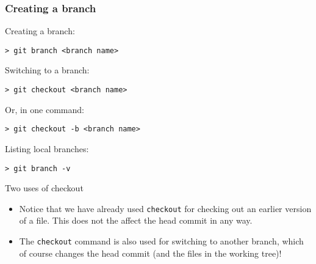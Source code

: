 \begin{frame}[fragile]
	
\frametitle{Creating a branch}
	
Creating a branch:
\begin{verbatim}
> git branch <branch name>
\end{verbatim}

Switching to a branch:
\begin{verbatim}
> git checkout <branch name>
\end{verbatim}

Or, in one command:
\begin{verbatim}
> git checkout -b <branch name>
\end{verbatim}
	
Listing local branches:
\begin{verbatim}
> git branch -v
\end{verbatim}	

\begin{block}{Two uses of checkout}
	\begin{itemize}
	\item Notice that we have already used \texttt{checkout} for checking out an earlier version of a file. This does not the affect the head commit in any way.
	\item The \texttt{checkout} command is also used for switching to another branch, which of course changes the head commit (and the files in the working tree)!
	\end{itemize}
\end{block}	
	
	
\end{frame}


